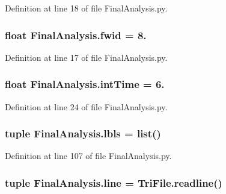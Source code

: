 Definition at line 18 of file Final\-Analysis.\-py.

\hypertarget{namespace_final_analysis_abc30d10b634674cdb4958c494025d3ce}{
\subsubsection[{fwid}]{\setlength{\rightskip}{0pt plus 5cm}float Final\-Analysis.\-fwid = 8.}}\label{namespace_final_analysis_abc30d10b634674cdb4958c494025d3ce}


Definition at line 17 of file Final\-Analysis.\-py.

\hypertarget{namespace_final_analysis_ae7544fab9b92313efce519dfcbe443ef}{
\subsubsection[{int\-Time}]{\setlength{\rightskip}{0pt plus 5cm}float Final\-Analysis.\-int\-Time = 6.}}\label{namespace_final_analysis_ae7544fab9b92313efce519dfcbe443ef}


Definition at line 24 of file Final\-Analysis.\-py.

\hypertarget{namespace_final_analysis_ad0acefcc028d6b5ed6a5df8a33837c93}{
\subsubsection[{lbls}]{\setlength{\rightskip}{0pt plus 5cm}tuple Final\-Analysis.\-lbls = list()}}\label{namespace_final_analysis_ad0acefcc028d6b5ed6a5df8a33837c93}


Definition at line 107 of file Final\-Analysis.\-py.

\hypertarget{namespace_final_analysis_a7c83462f12c6791e4425510419b04eb4}{
\subsubsection[{line}]{\setlength{\rightskip}{0pt plus 5cm}tuple Final\-Analysis.\-line = Tri\-File.\-readline()}}\label{namespace_final_analysis_a7c83462f12c6791e4425510419b04eb4}


